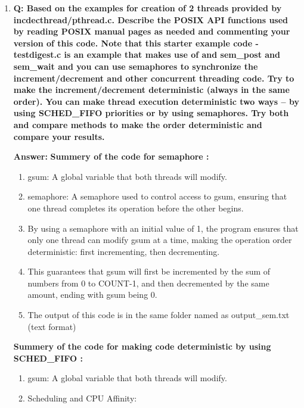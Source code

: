 \documentclass[a4paper,11pt]{article}%
\newenvironment{qanda}{\setlength{\parindent}{0pt}}{\bigskip}
\newcommand{\Q}{\bigskip\bfseries Q: }
\newcommand{\A}{\par\textbf{Answer: } \normalfont}
\begin{document}
\begin{qanda}
\begin{enumerate}
\begin{enumerate}
\begin{enumerate}
\begin{enumerate}
					\end{enumerate}
				\end{enumerate}

				\item \Q Based on the examples for creation of 2 threads provided by incdecthread/pthread.c. Describe the POSIX API functions used by reading POSIX manual pages as needed and commenting your version of this code. Note that this starter example code - testdigest.c is an example that makes use of and sem\_post and sem\_wait and you can use semaphores to synchronize the increment/decrement and other concurrent threading code. Try to make the increment/decrement deterministic (always in the same order). You can make thread execution deterministic two ways – by using SCHED\_FIFO priorities or by using semaphores. Try both and compare methods to make the order deterministic and compare your results.

				      \A \textbf{Summery of the code for semaphore :}
						\begin{enumerate}
							\item gsum: A global variable that both threads will modify.
							\item semaphore: A semaphore used to control access to gsum, ensuring that one thread completes its operation before the other begins.
							\item By using a semaphore with an initial value of 1, the program ensures that only one thread can modify gsum at a time, making the operation order deterministic: first incrementing, then decrementing.
							\item This guarantees that gsum will first be incremented by the sum of numbers from 0 to COUNT-1, and then decremented by the same amount, ending with gsum being 0.
							\item  The output of this code is in the same folder named as output\_sem.txt (text format)
							
						\end{enumerate} 
						\textbf{Summery of the code for making code deterministic by using SCHED\_FIFO :}
						\begin{enumerate}
							\item gsum: A global variable that both threads will modify.
							\item Scheduling and CPU Affinity:\\


\end{enumerate}
\end{enumerate}
\end{enumerate}
\end{qanda}
\end{document}
